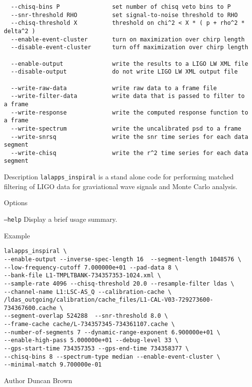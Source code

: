 \begin{entry}
\begin{verbatim}
  --chisq-bins P               set number of chisq veto bins to P
  --snr-threshold RHO          set signal-to-noise threshold to RHO
  --chisq-threshold X          threshold on chi^2 < X * ( p + rho^2 * delta^2 )
  --enable-event-cluster       turn on maximization over chirp length
  --disable-event-cluster      turn off maximization over chirp length

  --enable-output              write the results to a LIGO LW XML file
  --disable-output             do not write LIGO LW XML output file

  --write-raw-data             write raw data to a frame file
  --write-filter-data          write data that is passed to filter to a frame
  --write-response             write the computed response function to a frame
  --write-spectrum             write the uncalibrated psd to a frame
  --write-snrsq                write the snr time series for each data segment
  --write-chisq                write the r^2 time series for each data segment
\end{verbatim}

\item[Description] 
\verb$lalapps_inspiral$ is a stand alone code for performing matched filtering
of LIGO data for graviational wave signals and Monte Carlo analysis.

\item[Options]\leavevmode
\begin{entry}
\item[\texttt{--help}] Display a brief usage summary.
\end{entry}

\item[Example]
\begin{verbatim}
lalapps_inspiral \
--enable-output --inverse-spec-length 16  --segment-length 1048576 \
--low-frequency-cutoff 7.000000e+01 --pad-data 8 \
--bank-file L1-TMPLTBANK-734357353-1024.xml \
--sample-rate 4096 --chisq-threshold 20.0 --resample-filter ldas \
--channel-name L1:LSC-AS_Q --calibration-cache \
/ldas_outgoing/calibration/cache_files/L1-CAL-V03-729273600-734367600.cache \
--segment-overlap 524288  --snr-threshold 8.0 \
--frame-cache cache/L-734357345-734361107.cache \
--number-of-segments 7 --dynamic-range-exponent 6.900000e+01 \
--enable-high-pass 5.000000e+01 --debug-level 33 \
--gps-start-time 734357353 --gps-end-time 734358377 \
--chisq-bins 8 --spectrum-type median --enable-event-cluster \
--minimal-match 9.700000e-01
\end{verbatim}

\item[Author] 
Duncan Brown
\end{entry}
\clearpage

